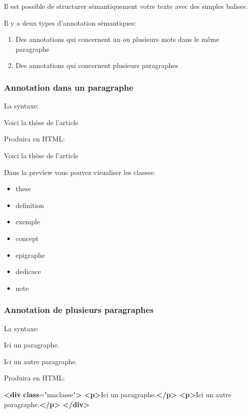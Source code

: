\documentclass[12pt,french,letterpaper]{article}
\newenvironment{Shaded}{}{}
\newcommand{\ErrorTok}[1]{\textcolor[rgb]{1.00,0.00,0.00}{\textbf{#1}}}
\newcommand{\KeywordTok}[1]{\textcolor[rgb]{0.00,0.44,0.13}{\textbf{#1}}}
\newcommand{\NormalTok}[1]{#1}
\newcommand{\OtherTok}[1]{\textcolor[rgb]{0.00,0.44,0.13}{#1}}
\newcommand{\StringTok}[1]{\textcolor[rgb]{0.25,0.44,0.63}{#1}}
\providecommand{\tightlist}{%
  \setlength{\itemsep}{0pt}\setlength{\parskip}{0pt}}
\begin{document}
Il est possible de structurer sémantiquement votre texte avec des
simples balises.

Il y a deux types d'annotation sémantiques:

\begin{enumerate}
\def\labelenumi{\arabic{enumi}.}
\tightlist
\item
  Des annotations qui concernent un ou plusieurs mots dans le même
  paragraphe
\item
  Des annotations qui concernent plusieurs paragraphes
\end{enumerate}

\hypertarget{annotation-dans-un-paragraphe}{%
\subsubsection{Annotation dans un
paragraphe}\label{annotation-dans-un-paragraphe}}

La syntaxe:

{Voici la thèse de l'article}

Produira en HTML:

{Voici la thèse de l'article}

Dans la preview vous pouvez visualiser les classes:

\begin{itemize}
\tightlist
\item
  these
\item
  definition
\item
  exemple
\item
  concept
\item
  epigraphe
\item
  dedicace
\item
  note
\end{itemize}

\hypertarget{annotation-de-plusieurs-paragraphes}{%
\subsubsection{Annotation de plusieurs
paragraphes}\label{annotation-de-plusieurs-paragraphes}}

La syntaxe:

Ici un paragraphe.

Ici un autre paragraphe.

Produira en HTML:

\begin{Shaded}
\begin{Highlighting}[]

\KeywordTok{\textless{}div} \ErrorTok{class}\OtherTok{=}\StringTok{"maclasse"}\KeywordTok{\textgreater{}}
  \KeywordTok{\textless{}p\textgreater{}}\NormalTok{Ici un paragraphe.}\KeywordTok{\textless{}/p\textgreater{}}
  \KeywordTok{\textless{}p\textgreater{}}\NormalTok{Ici un autre paragraphe.}\KeywordTok{\textless{}/p\textgreater{}}
\KeywordTok{\textless{}/div\textgreater{}}
\end{Highlighting}
\end{Shaded}
\end{document}
